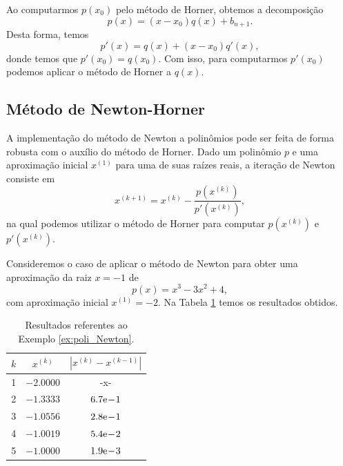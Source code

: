 \begin{obs}\label{obs:Horner_polider}
  Ao computarmos $p(x_0)$ pelo método de Horner, obtemos a decomposição
  \begin{equation}
    p(x) = (x-x_0)q(x) + b_{n+1}.
  \end{equation}
Desta forma, temos
\begin{equation}
  p'(x) = q(x) + (x-x_0)q'(x),
\end{equation}
donde temos que $p'(x_0) = q(x_0)$. Com isso, para computarmos $p'(x_0)$ podemos aplicar o método de Horner a $q(x)$.

% 
\end{obs}

\subsection{Método de Newton-Horner}
\badgeRevisar

A implementação do método de Newton a polinômios pode ser feita de forma robusta com o auxílio do método de Horner. Dado um polinômio $p$ e uma aproximação inicial $x^{(1)}$ para uma de suas raízes reais, a iteração de Newton consiste em
\begin{equation}
  x^{(k+1)} = x^{(k)} - \frac{p(x^{(k)})}{p'(x^{(k)})},
\end{equation}
na qual podemos utilizar o método de Horner para computar $p(x^{(k)})$ e $p'(x^{(k)})$.

\begin{ex}\label{ex:poli_Newton}
  Consideremos o caso de aplicar o método de Newton para obter uma aproximação da raiz $x=-1$ de
  \begin{equation}
    p(x) = x^3 - 3x^2 + 4,
  \end{equation}
  com aproximação inicial $x^{(1)} = -2$. Na Tabela \ref{tab:ex_poli_Newton} temos os resultados obtidos.

\begin{table}[h!]
  \centering
  \caption{Resultados referentes ao Exemplo \ref{ex:poli_Newton}.}
  \label{tab:ex_poli_Newton}
  \begin{tabular}{r|cc}
    $k$ & $x^{(k)}$ & $|x^{(k)}-x^{(k-1)}|$ \\\hline
    1 & $-2.0000$ & -x- \\
    2 & $-1.3333$ & $6.7\mathrm{e}\!-\!1$ \\
    3 & $-1.0556$ & $2.8\mathrm{e}\!-\!1$ \\
    4 & $-1.0019$ & $5.4\mathrm{e}\!-\!2$ \\
    5 & $-1.0000$ & $1.9\mathrm{e}\!-\!3$ \\\hline
  \end{tabular}
\end{table}

\end{ex}

